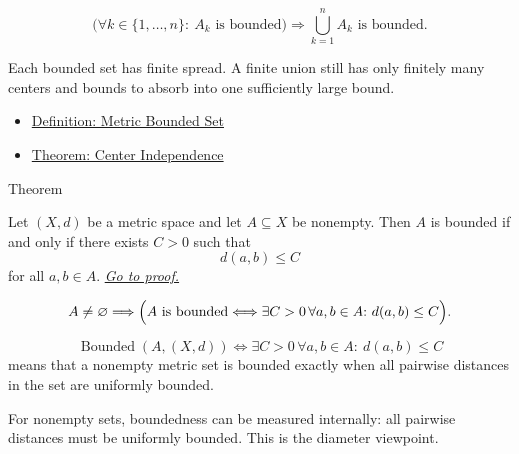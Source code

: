 \begin{remark*}
\[
\bigl(\forall k\in\{1,\ldots,n\}{:}\ A_k\text{ is bounded}\bigr)
\Longrightarrow
\bigcup_{k=1}^n A_k\text{ is bounded}.
\]
\end{remark*}

\begin{remark*}[Interpretation]
Each bounded set has finite spread.  A finite union still has only finitely
many centers and bounds to absorb into one sufficiently large bound.
\end{remark*}

\begin{dependencies}
\begin{itemize}
  \item \hyperref[def:metric-bounded-set]{Definition: Metric Bounded Set}
  \item \hyperref[thm:metric-bounded-center-independence]{Theorem: Center Independence}
\end{itemize}
\end{dependencies}

\begin{theorembox}{Theorem}
\begin{theorem}\label{thm:metric-boundedness-via-diameter}
Let \((X,d)\) be a metric space and let \(A\subseteq X\) be nonempty.  Then
\(A\) is bounded if and only if there exists \(C>0\) such that
\[
  d(a,b)\leq C
\]
for all \(a,b\in A\).
\hyperref[prf:metric-boundedness-via-diameter]{\textit{Go to proof.}}
\end{theorem}
\end{theorembox}

\begin{remark*}
\[
A\neq\varnothing
\Longrightarrow
\Bigl(
A\text{ is bounded}
\Longleftrightarrow
\exists C>0\,\forall a,b\in A{:}\ d(a,b)\leq C
\Bigr).
\]
\end{remark*}

\begin{remark*}
\[
\operatorname{Bounded}(A,(X,d))
\Longleftrightarrow
\exists C>0\,\forall a,b\in A{:}\ d(a,b)\leq C
\]
means that a nonempty metric set is bounded exactly when all pairwise
distances in the set are uniformly bounded.
\end{remark*}

\begin{remark*}[Interpretation]
For nonempty sets, boundedness can be measured internally: all pairwise
distances must be uniformly bounded.  This is the diameter viewpoint.
\end{remark*}

